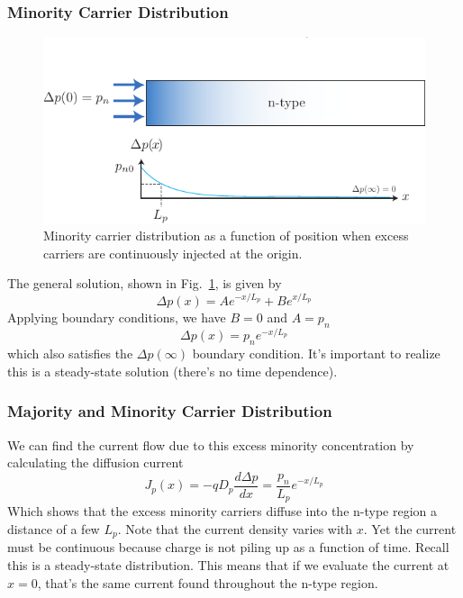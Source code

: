 \subsubsection*{Minority Carrier Distribution}
\begin{figure}[tb]
\begin{center}
\includegraphics[width=.75\columnwidth]{excess_charge_inject_sol}
\end{center}
\caption{Minority carrier distribution as a function of position when excess carriers are continuously injected at the origin.}
\label{fig:excess_charge_inject_sol}
\end{figure}
The general solution, shown in Fig.~\ref{fig:excess_charge_inject_sol}, is given by
\begin{equation}
	\Delta p(x) = A e^{-x/L_p} + B e^{x/L_p}
\end{equation}	
 Applying boundary conditions, we have $B = 0$ and $A = p_{n}$
\begin{equation}
	\Delta p(x) = p_n e^{-x/L_p} 
\end{equation}	
which also satisfies the $\Delta p(\infty)$ boundary condition.  It's important to realize this is a steady-state solution (there's no time dependence).   
\subsubsection*{Majority and Minority Carrier Distribution}
We can find the current flow due to this excess minority concentration by calculating the diffusion current
\begin{equation}
	J_p(x) = -q D_p \frac{d \Delta p}{dx} = \frac{p_n}{L_p} e^{-x/L_p} 
\end{equation}	
Which shows that the excess minority carriers diffuse into the n-type region a distance of a few $L_p$.  Note that the current density varies with $x$.  Yet the current must be continuous because charge is not piling up as a function of time.  Recall this is a steady-state distribution.  This means that if we evaluate the current at $x = 0$, that's the same current found throughout the n-type region. 
 
